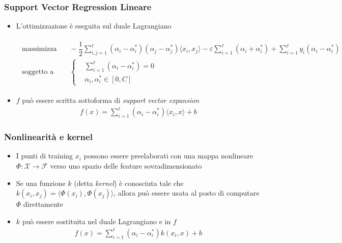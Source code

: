 \documentclass[table]{beamer}
\begin{document}
\begin{frame}
\frametitle{Support Vector Regression Lineare}
\begin{itemize}
\item L'ottimizzazione è eseguita sul duale Lagrangiano
\begin{scriptsize}
\begin{align*}
\begin{aligned}
\text{massimizza} &\quad
-\dfrac{1}{2}\sum_{i,j=1}^{\ell}(\alpha_{i} - \alpha_{i}^{*})(\alpha_{j} - \alpha_{j}^{*})\langle x_{i},x_{j} \rangle -\varepsilon\sum_{i=1}^{\ell}(\alpha_{i} + \alpha_{i}^{*}) + \sum_{i=1}^{\ell}y_{i}(\alpha_{i}-\alpha_{i}^{*}) \\
\text{soggetto a} &\quad \left\{\begin{aligned}
&\sum_{i=1}^{\ell}(\alpha_{i} - \alpha_{i}^{*}) = 0\\
&\alpha_{i},\alpha_{i}^{*} \in [0,C]
\end{aligned}\right.
\end{aligned}
\end{align*}
\end{scriptsize}
\item $ f $ può essere scritta sottoforma di \textit{support vector expansion}
\begin{align*}
f(x) = \sum_{i=1}^{\ell}(\alpha_{i}-\alpha_{i}^{*})\langle x_{i},x\rangle + b
\end{align*}
\end{itemize}
\end{frame}


\begin{frame}
\frametitle{Nonlinearità e kernel}
\begin{itemize}
\item I punti di training $ x_{i} $ possono essere preelaborati con una mappa nonlineare $ \Phi : \mathcal{X} \rightarrow \mathcal{F} $ verso uno spazio delle feature sovradimensionato
\item Se una funzione $ k $ (detta \textit{kernel}) è conosciuta tale che $ k(x_{i},x_{j}) = \langle\Phi (x_{i}),\Phi (x_{j})\rangle $, allora può essere usata al posto di computare $ \Phi $ direttamente
\item $k$ può essere sostituita nel duale Lagrangiano e in $f$
\begin{align*}
f(x) = \sum_{i=1}^{\ell}(\alpha_{i}-\alpha_{i}^{*})k(x_{i},x) + b
\end{align*}
\end{itemize}
\end{frame}
\end{document}
